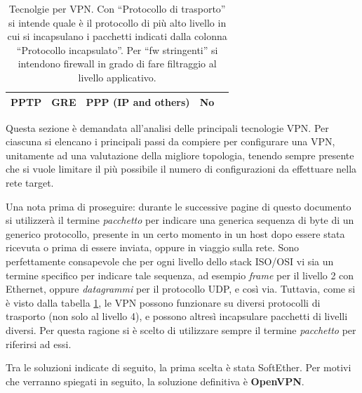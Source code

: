 \begin{table}
\begin{tabular}{|p{3.5cm}|p{2.7cm}|p{3.1cm}|p{3cm}|p{5cm}|}
		\hline
		PPTP                            & GRE                     & PPP (IP and others)        & No                   \\%
		\hline
	\end{tabular}
	\caption[Principali tecnologie per VPN.]{Tecnolgie per VPN. Con ``Protocollo di trasporto'' si intende
	quale è il protocollo di più alto livello in cui si incapsulano i pacchetti indicati
	dalla colonna ``Protocollo incapsulato''. Per ``fw stringenti'' si intendono firewall
in grado di fare filtraggio al livello applicativo.}
	\label{tbl:vpn-comparison}
\end{table}

Questa sezione è demandata all'analisi delle principali tecnologie VPN. Per ciascuna
si elencano i principali passi da compiere per configurare una VPN, unitamente ad una valutazione
della migliore topologia, tenendo sempre presente che si vuole limitare il più possibile
il numero di configurazioni da effettuare nella rete target.

Una nota prima di proseguire: durante le successive pagine di questo documento si utilizzerà
il termine \textit{pacchetto} per indicare una generica sequenza di byte di un generico
protocollo, presente in un certo momento in un host dopo essere stata ricevuta o prima
di essere inviata, oppure in viaggio sulla rete. Sono perfettamente consapevole che per
ogni livello dello stack ISO/OSI vi sia un termine specifico per indicare tale
sequenza, ad esempio \textit{frame} per il livello 2 con Ethernet, oppure \textit{datagrammi}
per il protocollo UDP, e così via. Tuttavia, come si è visto dalla tabella \ref{tbl:vpn-comparison},
le VPN possono funzionare su diversi protocolli di trasporto (non solo al livello 4),
e possono altresì incapsulare
pacchetti di livelli diversi. Per questa ragione si è scelto di utilizzare
sempre il termine \textit{pacchetto} per riferirsi ad essi.


Tra le soluzioni indicate di seguito, la prima scelta è stata SoftEther. Per motivi che
verranno spiegati in seguito, la soluzione definitiva è \textbf{OpenVPN}.
